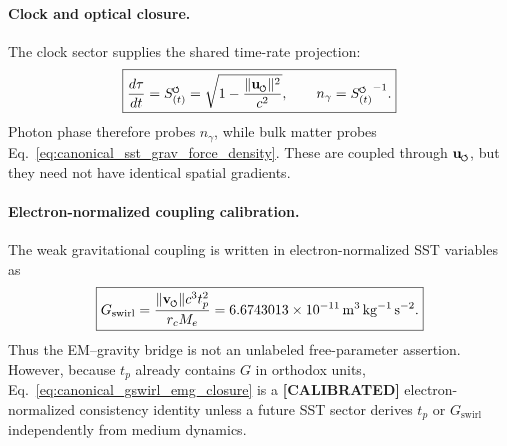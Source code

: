 \documentclass[11pt]{article}
\theoremstyle{definition}
\theoremstyle{plain}
\theoremstyle{remark}
\newcommand{\swirlarrow}{\mathchoice{\mkern-2mu\scriptstyle\boldsymbol{\circlearrowleft}}{\mkern-2mu\scriptstyle\boldsymbol{\circlearrowleft}}{\mkern-2mu\scriptscriptstyle\boldsymbol{\circlearrowleft}}{\mkern-2mu\scriptscriptstyle\boldsymbol{\circlearrowleft}}}
\newcommand{\vswirl}{\mathbf{v}_{\swirlarrow}}
\newcommand{\SwirlClock}{{S_{(t)}^{\swirlarrow}}}
\newcommand{\rc}{{r_c}}
\begin{document}
        \paragraph{Clock and optical closure.}
        The clock sector supplies the shared time-rate projection:
        \begin{align}
            \boxed{
            \frac{d\tau}{dt}
            =
            \SwirlClock
            =
            \sqrt{1-\frac{\lVert\mathbf{u}_{\swirlarrow}\rVert^2}{c^2}},
            \qquad
            n_\gamma=\SwirlClock^{-1}.
            }
            \label{eq:canonical_emg_clock_optical_closure}
        \end{align}
        Photon phase therefore probes \(n_\gamma\), while bulk matter probes Eq.~\eqref{eq:canonical_sst_grav_force_density}. These are coupled through \(\mathbf{u}_{\swirlarrow}\), but they need not have identical spatial gradients.

        \paragraph{Electron-normalized coupling calibration.}
        The weak gravitational coupling is written in electron-normalized SST variables as
        \begin{align}
            \boxed{
            G_{\mathrm{swirl}}
            =
            \frac{\lVert\vswirl\rVert c^3 t_p^2}{\rc M_e}
            =
            6.6743013\times10^{-11}\,\mathrm{m^3\,kg^{-1}\,s^{-2}}.
            }
            \label{eq:canonical_gswirl_emg_closure}
        \end{align}
        Thus the EM--gravity bridge is not an unlabeled free-parameter assertion. However, because \(t_p\) already contains \(G\) in orthodox units, Eq.~\eqref{eq:canonical_gswirl_emg_closure} is a \textbf{[CALIBRATED]} electron-normalized consistency identity unless a future SST sector derives \(t_p\) or \(G_{\mathrm{swirl}}\) independently from medium dynamics.
\end{document}
